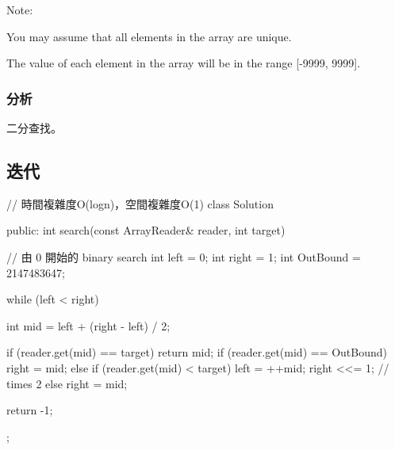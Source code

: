 Note:
\begindot
\item You may assume that all elements in the array are unique.
\item The value of each element in the array will be in the range [-9999, 9999].
\myenddot


\subsubsection{分析}
二分查找。


\subsection{迭代}
\begin{Code}
// 時間複雜度O(logn)，空間複雜度O(1)
class Solution {
public:
    int search(const ArrayReader& reader, int target) {
        // 由 0 開始的 binary search
        int left = 0;
        int right = 1;
        int OutBound = 2147483647;

        while (left < right) {
            int mid = left + (right - left) / 2;

            if (reader.get(mid) == target) return mid;
            if (reader.get(mid) == OutBound)
                right = mid;
            else if (reader.get(mid) < target) {
                left = ++mid;
                right <<= 1; // times 2
            }
            else
                right = mid;
        }

        return -1;
    }
};
\end{Code}
